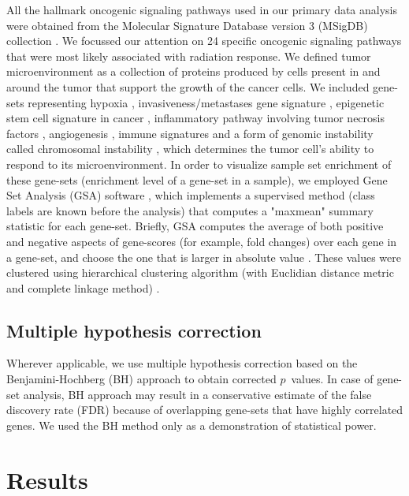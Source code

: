 \documentclass[hidelinks,11pt]{article}
\begin{document}
All the hallmark oncogenic signaling pathways used in our primary data analysis were obtained from the Molecular Signature Database version 3 (MSigDB) collection \cite{msigdb_hm}. We focussed our attention on 24 specific oncogenic signaling pathways that were most likely associated with radiation response. We defined tumor microenvironment as a collection of proteins produced by cells present in and around the tumor that support the growth of the cancer cells. We included gene-sets representing hypoxia \cite{hypoxia}, invasiveness/metastases gene signature \cite{IGS}, epigenetic stem cell signature in cancer \cite{epigen}, inflammatory pathway involving tumor necrosis factors \cite{TNF}, angiogenesis \cite{WH}, immune signatures \cite{immune} and a form of genomic instability called chromosomal instability \cite{CIN}, which determines the tumor cell's ability to respond to its microenvironment. In order to visualize sample set enrichment of these gene-sets (enrichment level of a gene-set in a sample), we employed Gene Set Analysis (GSA) software \cite{gsa_software}, which implements a supervised method (class labels are known before the analysis) that computes a "maxmean" summary statistic for each gene-set. Briefly, GSA computes the average of both positive and negative aspects of gene-scores (for example, fold changes) over each gene in a gene-set, and choose the one that is larger in absolute value \cite{gsa}. These values were clustered using hierarchical clustering algorithm (with Euclidian distance metric and complete linkage method) \cite{clustering}. 

\subsection*{Multiple hypothesis correction}

Wherever applicable, we use multiple hypothesis correction based on the Benjamini-Hochberg (BH) approach \cite{BH} to obtain corrected $p$~values. In case of gene-set analysis, BH approach may result in a conservative estimate of the false discovery rate (FDR) because of overlapping gene-sets that have highly correlated genes. We used the BH method only as a demonstration of statistical power. 

\section*{Results}
\end{document}
